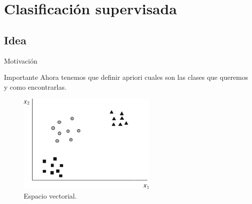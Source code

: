 \documentclass[handout,draft]{beamer}
\begin{document}
\section{Clasificaci\'on supervisada}
\subsection{Idea}
\begin{frame}{Motivaci\'on}
  \begin{center}
    \end{center}
\end{frame}

\begin{frame}{\subsecname}
  \begin{alertblock}{Importante}
    Ahora tenemos que definir apriori cuales son las clases que queremos y como encontrarlas.
  \end{alertblock}
\end{frame}

\begin{frame}{\subsecname}
  \begin{figure}
  \includegraphics[width=0.6\textwidth]{imagenes/vector-3.png}
  \caption{Espacio vectorial.}
  \end{figure}
\end{frame}
\end{document}
